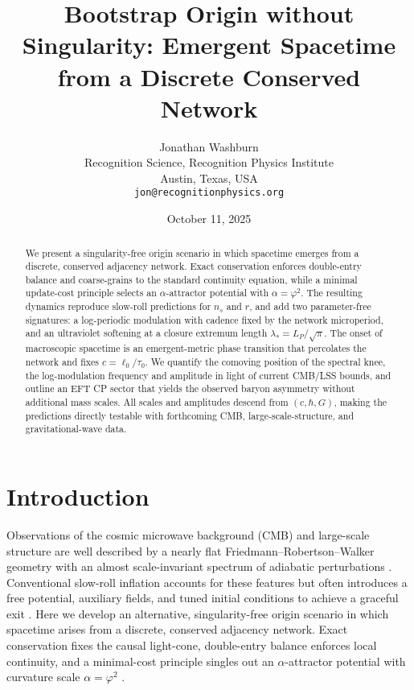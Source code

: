 \documentclass[11pt]{article}
\title{\textbf{Bootstrap Origin without Singularity: Emergent Spacetime from a Discrete Conserved Network}}
\author{Jonathan Washburn\\
Recognition Science, Recognition Physics Institute\\
Austin, Texas, USA\\
\texttt{jon@recognitionphysics.org}}
\date{October 11, 2025}
\theoremstyle{definition}
\theoremstyle{remark}
\begin{document}
\maketitle

\begin{abstract}
We present a singularity-free origin scenario in which spacetime emerges from a discrete, conserved adjacency network. Exact conservation enforces double-entry balance and coarse-grains to the standard continuity equation, while a minimal update-cost principle selects an \(\alpha\)-attractor potential with \(\alpha=\varphi^2\). The resulting dynamics reproduce slow-roll predictions for \(n_s\) and \(r\), and add two parameter-free signatures: a log-periodic modulation with cadence fixed by the network microperiod, and an ultraviolet softening at a closure extremum length \(\lambda_{\ast}=L_P/\sqrt{\pi}\). The onset of macroscopic spacetime is an emergent-metric phase transition that percolates the network and fixes \(c=\ell_0/\tau_0\). We quantify the comoving position of the spectral knee, the log-modulation frequency and amplitude in light of current CMB/LSS bounds, and outline an EFT CP sector that yields the observed baryon asymmetry without additional mass scales. All scales and amplitudes descend from \((c,\hbar,G)\), making the predictions directly testable with forthcoming CMB, large-scale-structure, and gravitational-wave data.
\end{abstract}

\section{Introduction}
Observations of the cosmic microwave background (CMB) and large-scale structure are well described by a nearly flat Friedmann–Robertson–Walker geometry with an almost scale-invariant spectrum of adiabatic perturbations \citep{Planck2018,Dodelson2020}. Conventional slow-roll inflation accounts for these features but often introduces a free potential, auxiliary fields, and tuned initial conditions to achieve a graceful exit \citep{Starobinsky1980,AlbrechtSteinhardt1982,Linde1982}. Here we develop an alternative, singularity-free origin scenario in which spacetime arises from a discrete, conserved adjacency network. Exact conservation fixes the causal light-cone, double-entry balance enforces local continuity, and a minimal-cost principle singles out an \(\alpha\)-attractor potential with curvature scale \(\alpha=\varphi^2\) \citep{KalloshLinde2013}.
\end{document}
